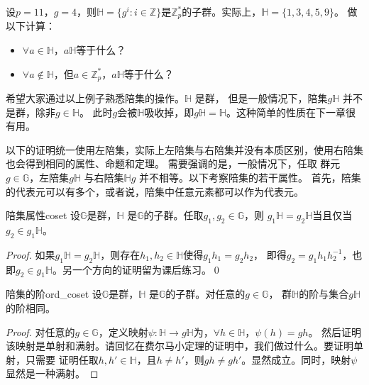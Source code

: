  \begin{example}
 	设$p = 11$，$g = 4$，则$\mathbb{H} = \{ g^i: i \in \mathbb{Z} \}$是$\mathbb{Z}_p^*$的子群。实际上，$\mathbb{H} = \{ 1, 3, 4, 5, 9 \}$。
 	做以下计算：
 	\begin{itemize}
 		\item $\forall a \in \mathbb{H}$，$a\mathbb{H}$等于什么？
 		
 		\item $\forall a \notin \mathbb{H}$，但$a \in \mathbb{Z}_p^*$，$a\mathbb{H}$等于什么？
 	\end{itemize}
 \end{example}
 希望大家通过以上例子熟悉陪集的操作。$\mathbb{H}$ 是群，
 但是一般情况下，陪集$g \mathbb{H}$ 并不是群，除非$g\in\mathbb{H}$。
 此时$g$会被$\mathbb{H}$吸收掉，即$g\mathbb{H}=\mathbb{H}$。这种简单的性质在下一章很有用。
 
 以下的证明统一使用左陪集，实际上左陪集与右陪集并没有本质区别，使用右陪集也会得到相同的属性、命题和定理。
 需要强调的是，一般情况下，任取
 群元$g \in \mathbb{G}$，左陪集$g \mathbb{H}$ 与右陪集$\mathbb{H} g$ 并不相等。以下考察陪集的若干属性。
 首先，陪集的代表元可以有多个，或者说，陪集中任意元素都可以作为代表元。 
 \begin{proposition}{陪集属性}{coset}
  		设$\mathbb{G}$是群，$\mathbb{H}$ 是$\mathbb{G}$的子群。任取$g_1, g_2 \in \mathbb{G}$，则
  		$g_1 \mathbb{H} = g_2 \mathbb{H}$当且仅当$g_2 \in g_1 \mathbb{H}$。
  \end{proposition}
  
  \begin{proof}
  如果$g_1 \mathbb{H} = g_2 \mathbb{H}$，则存在$h_1, h_2 \in \mathbb{H}$使得$g_1 h_1 = g_2 h_2$，
  即得$g_2 = g_1 h_1 h_2^{-1}$，也即$g_2 \in g_1 \mathbb{H}$。另一个方向的证明留为课后练习。\qed
  \end{proof}
  	
 	\begin{proposition}{陪集的阶}{ord_coset}
 		设$\mathbb{G}$是群，$\mathbb{H}$ 是$\mathbb{G}$的子群。对任意的$g \in \mathbb{G}$，
 		群$\mathbb{H}$的阶与集合$g\mathbb{H}$的阶相同。
 	\end{proposition}
 	
 \begin{proof}
 	对任意的$g \in \mathbb{G}$，定义映射$\psi : \mathbb{H}\rightarrow g\mathbb{H}$为，$\forall h \in \mathbb{H}$，$\psi(h)=gh$。
 	然后证明该映射是单射和满射。请回忆在费尔马小定理的证明中，我们做过什么。要证明单射，只需要
 	证明任取$h, h' \in \mathbb{H}$，且$h \neq h'$，则$gh \neq gh'$。显然成立。同时，映射$\psi$显然是一种满射。
 \end{proof}
 
